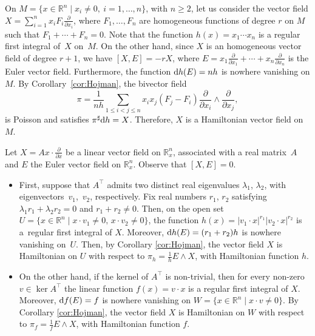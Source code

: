 \documentclass[pdftex]{sigma}%
\newcommand{\R}[1]{\mathbb{R}^{#1}}
\newcommand{\dd}{{\rm d}}
\numberwithin{equation}{section}
\begin{document}
\begin{Example}
On $M=\{ x \in \R{n} \mid x_{i} \neq 0,\ i= 1,\dots,n\}$, with $n\geq2$, let us consider the vector field $X = \sum_{i=1}^{n} x_{i}F_{i}\frac{\partial}{\partial x_{i}}$, where $F_{1},\dots,F_{n}$ are homogeneous functions of degree $r$ on $M$ such that $F_{1} + \cdots + F_{n} = 0$. Note that the function $h(x)=x_{1} \cdots x_{n}$ is a regular first integral of~$X$ on~$M$. On the other hand, since $X$ is an homogeneous vector field of degree $r+1$, we have $[X,E] = -rX$, where $E = x_{1}\frac{\partial}{\partial x_{1}} + \cdots + x_{n}\frac{\partial}{\partial x_{n}}$ is the Euler vector field. Furthermore, the function $\dd h(E) = nh$ is nowhere vanishing on $M$. By Corollary~\ref{cor:Hojman}, the bivector field
 \begin{equation*}
 \pi = \frac{1}{nh} \sum_{1 \leq i < j \leq n} x_i x_j (F_j - F_i) \frac{\partial}{\partial x_i} \wedge \frac{\partial}{\partial x_j},
 \end{equation*}
is Poisson and satisfies $\pi^{\sharp}\dd h = X$. Therefore, $X$ is a Hamiltonian vector field on~$M$.
\end{Example}

\begin{Example}
Let $X = Ax\cdot\frac{\partial}{\partial x}$ be a linear vector field on $\R{n}_{x}$, associated with a real mat\-rix~$A$ and $E$ the Euler vector field on $\R{n}_{x}$. Observe that $[X,E] = 0$.
\begin{itemize}\itemsep=0pt
\item First, suppose that $A^{\top}$ admits two distinct real eigenvalues $\lambda_{1}$, $\lambda_{2}$, with eigenvectors~$v_{1}$,~$v_{2}$, respectively. Fix real numbers $r_{1}$, $r_{2}$ satisfying $\lambda_{1}r_{1} + \lambda_{2}r_{2} = 0$ and $r_{1} + r_{2} \neq 0$. Then, on the open set $U = \{x\in\R{n} \mid x\cdot v_{1}\neq0, \, x\cdot v_{2}\neq 0\}$, the function $h(x) = |v_{1} \cdot x|^{r_{1}} |v_{2}\cdot x|^{r_{2}}$ is a~regular first integral of $X$. Moreover, $\dd h(E)= (r_{1} + r_{2}) h$ is nowhere vanishing on~$U$. Then, by Corollary \ref{cor:Hojman}, the vector field $X$ is Hamiltonian on $U$ with respect to $\pi_{h} = \frac{1}{h}E \wedge X$, with Hamiltonian function $h$.
\item On the other hand, if the kernel of $A^{\top}$ is non-trivial, then for every non-zero $v \in \ker{A^{\top}}$ the linear function $f(x) = v \cdot x$ is a regular first integral of $X$. Moreover, $\dd f(E)= f$ is nowhere vanishing on $W = \{x\in\R{n} \mid x\cdot v\neq0\}$. By Corollary \ref{cor:Hojman}, the vector field $X$ is Hamiltonian on $W$ with respect to $\pi_{f} = \frac{1}{f}E \wedge X$, with Hamiltonian function $f$.%
\end{itemize}
\end{Example}
\end{document}
